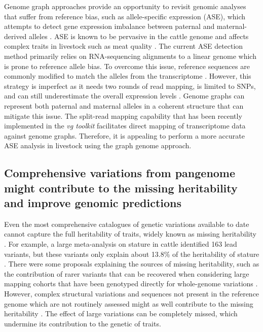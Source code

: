 \documentclass[../main.tex]{subfiles}
\begin{document}
Genome graph approaches provide an opportunity to revisit genomic analyses that suffer from reference bias, such as allele-specific expression (ASE), which attempts to detect gene expression imbalance between paternal and maternal-derived alleles \citep{castel2020vast}. ASE is known to be pervasive in the cattle genome \citep{chamberlain2015extensive} and affects complex traits in livestock such as meat quality \citep{guillocheau2019survey,bruscadin2021muscle}. The current ASE detection method primarily relies on RNA-sequencing alignments to a linear genome which is prone to reference allele bias. To overcome this issue, reference sequences are commonly modified to match the alleles from the transcriptome \citep{salavati2019elimination}. However, this strategy is imperfect as it needs two rounds of read mapping, is limited to SNPs, and can still underestimate the overall expression levels \citep{van2015wasp}. Genome graphs can represent both paternal and maternal alleles in a coherent structure that can mitigate this issue. The split-read mapping capability that has been recently implemented in the \emph{vg toolkit} \citep{Sibbesen2021} facilitates direct mapping of transcriptome data against genome graphs. Therefore, it is appealing to perform a more accurate ASE analysis in livestock using the graph genome approach. 

\subsection*{Comprehensive variations from pangenome might contribute to the missing heritability and improve genomic predictions}

Even the most comprehensive catalogues of genetic variations available to date cannot capture the full heritability of traits, widely known as missing heritability \citep{maher2008personal}. For example, a large meta-analysis on stature in cattle identified 163 lead variants, but these variants only explain about 13.8\% of the heritability of stature \citep{bouwman2018meta}. There were some proposals explaining the sources of missing heritability, such as the contribution of rarer variants \citep{gonzalez2015rare} that can be recovered when considering large mapping cohorts that have been genotyped directly for whole-genome variations \citep{wainschtein2019recovery}. However, complex structural variations and sequences not present in the reference genome which are not routinely assessed might as well contribute to the missing heritability \citep{genin2020missing,theunissen2020structural}. The effect of large variations can be completely missed, which undermine its contribution to the genetic of traits. 
\end{document}
